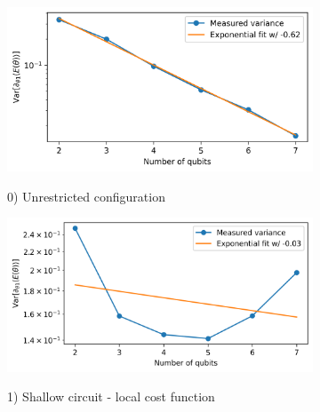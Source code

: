 \begin{figure}
    \centering
    \begin{subfigure}[b]{.49\linewidth}
        \includegraphics[width=\linewidth]{Artefact/Appendices/var0.png}
        \centerline{0) Unrestricted configuration}
    \end{subfigure}
    \hfill
    \begin{subfigure}[b]{.49\linewidth}
        \includegraphics[width=\linewidth]{Artefact/Appendices/var1.png}
        \centerline{1) Shallow circuit - local cost function}
    \end{subfigure}


\end{figure}

